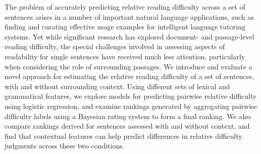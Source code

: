 The problem of accurately predicting relative reading difficulty across a set of sentences arises in a number of important natural language applications, such as finding and curating effective usage examples for intelligent language tutoring systems. Yet while significant research has explored document- and passage-level reading difficulty, the special challenges involved in assessing aspects of readability for single sentences have received much less attention, particularly when considering the role of surrounding passages. We introduce and evaluate a novel approach for estimating the relative reading difficulty of a set of sentences, with and without surrounding context. Using different sets of lexical and grammatical features, we explore models for predicting pairwise relative difficulty using logistic regression, and examine rankings generated by aggregating pairwise difficulty labels using a Bayesian rating system to form a final ranking. We also compare rankings derived for sentences assessed with and without context, and find that contextual features can help predict differences in relative difficulty judgments across these two conditions.
